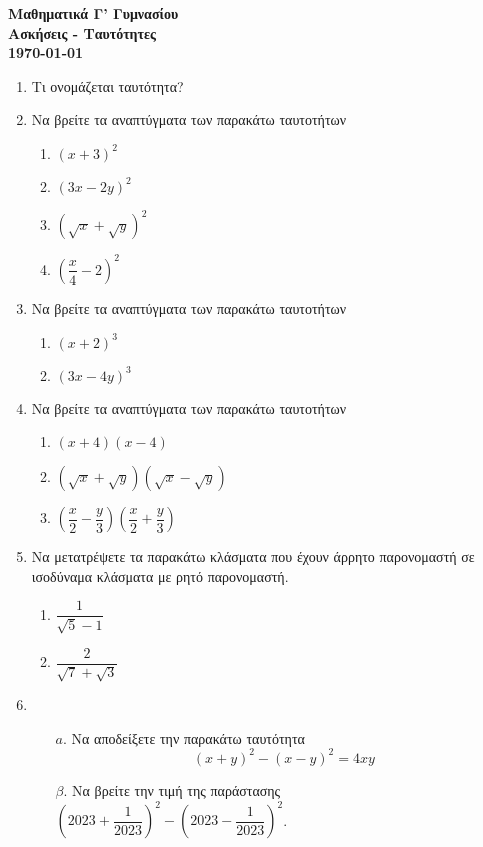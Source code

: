 \documentclass[11pt,a4paper]{article}
\newcommand{\kerkissans}[1]{{\fontfamily{maksf}\selectfont \textbf{#1}}}
\begin{document}
\begin{center}
{\LARGE \kerkissans{Μαθηματικά Γ' Γυμνασίου}}\\
{\large \kerkissans{Ασκήσεις - Ταυτότητες\\\today}}
\end{center}
\begin{enumerate}
\item Τι ονομάζεται ταυτότητα?
\item Να βρείτε τα αναπτύγματα των παρακάτω ταυτοτήτων
\begin{multicols}{3}
\begin{enumerate}[label=\roman*.]
\item $ (x+3)^2 $
\item $ (3x-2y)^2 $
\item $ \left(\sqrt{x}+\sqrt{y}\right)^2 $
\item $ \left(\dfrac{x}{4}-2 \right)^2 $
\end{enumerate}
\end{multicols}
\item Να βρείτε τα αναπτύγματα των παρακάτω ταυτοτήτων
\begin{multicols}{2}
\begin{enumerate}[label=\roman*.]
\item $ (x+2)^3 $
\item $ (3x-4y)^3 $
\end{enumerate}
\end{multicols}
\item Να βρείτε τα αναπτύγματα των παρακάτω ταυτοτήτων
\begin{multicols}{2}
\begin{enumerate}[label=\roman*.]
\item $ (x+4)(x-4) $
\item $ \left(\sqrt{x}+\sqrt{y}\right)\left(\sqrt{x}-\sqrt{y}\right) $
\item $ \left(\dfrac{x}{2}-\dfrac{y}{3}\right)\left(\dfrac{x}{2}+\dfrac{y}{3}\right) $
\end{enumerate}
\end{multicols}
\item Να μετατρέψετε τα παρακάτω κλάσματα που έχουν άρρητο παρονομαστή σε ισοδύναμα κλάσματα με ρητό παρονομαστή.
\begin{multicols}{2}
\begin{enumerate}[label=\roman*.]
\item $ \dfrac{1}{\sqrt{5}-1} $
\item $ \dfrac{2}{\sqrt{7}+\sqrt{3}} $
\end{enumerate}
\end{multicols}
\item \begin{enumerate}
\item[$ a $.] Να αποδείξετε την παρακάτω ταυτότητα \[ (x+y)^2-(x-y)^2=4xy \]
\item[$ \beta $.] Να βρείτε την τιμή της παράστασης $ \left(2023+\dfrac{1}{2023}\right)^2-\left(2023-\dfrac{1}{2023}\right)^2 $.
\end{enumerate}
\end{enumerate}
\mbox{}\\
\end{document}
